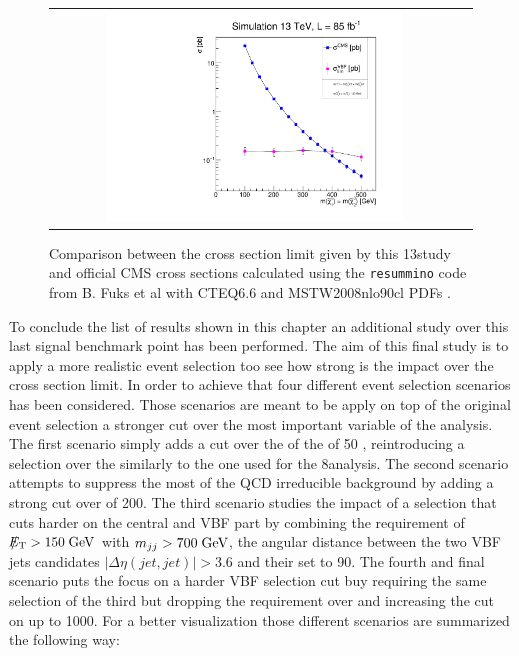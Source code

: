 \begin{figure}[tbh!]
	\centering
	\begin{tabular}{cc}
		\includegraphics[width=0.75\textwidth]{analysis/pics/out_xsecmin_lspcomp_stauclose.pdf}
	\end{tabular}
	\caption{Comparison between the cross section limit given by this 13\tev study and official CMS cross sections calculated using the \texttt{resummino} code from B. Fuks et al with CTEQ6.6 and MSTW2008nlo90cl PDFs \cite{Fuks:2013vua}.}
	\label{fig:xsec_confront_13tev}
\end{figure}


To conclude the list of results shown in this chapter an additional study over this last signal benchmark point has been performed. The aim of this final study is to apply a more realistic event selection too see how strong is the impact over the cross section limit. In order to achieve that four different event selection scenarios has been considered. Those scenarios are meant to be apply on top of the original event selection a stronger cut over the most important variable of the analysis. The first scenario simply adds a cut over the \pt of the \hadtau of 50 \gev, reintroducing a selection over the \hadtau similarly to the one used for the 8\tev analysis. The second scenario attempts to suppress the most of the QCD irreducible background by adding a strong cut over \met of 200\gev. The third scenario studies the impact of a selection that cuts harder on the central and VBF part by combining the requirement of $\slash\mkern-12mu{E}_{\text{T}} > 150\;\text{Ge}\kern-0.06667em\text{V}$  with $m_{jj} > 700\;\text{Ge}\kern-0.06667em\text{V}$, the angular distance between the two VBF jets candidates $|\Delta\eta(jet,jet)| > 3.6$ and their \pt set to 90\gev. The fourth and final scenario puts the focus on a harder VBF selection cut buy requiring the same selection of the third but dropping the requirement over \met and increasing the cut on \mjj up to 1000\gev. For a better visualization those different scenarios are summarized the following way:

